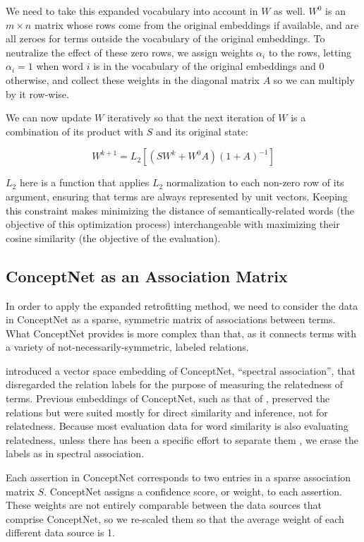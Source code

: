 \documentclass[11pt,letterpaper]{article}
\begin{document}
We need to take this expanded vocabulary into account in $W$ as well. $W^0$ is
an $m \times n$ matrix whose rows come from the original embeddings if available,
and are all zeroes for terms outside the vocabulary of the original embeddings.
To neutralize the effect of these zero rows, we assign
weights $\alpha_i$ to the rows, letting $\alpha_i = 1$ when word $i$ is
in the vocabulary of the original embeddings and $0$ otherwise, and collect these
weights in the diagonal matrix $A$ so we can multiply by it row-wise.

We can now update $W$ iteratively so that the next iteration of $W$ is a
combination of its product with $S$ and its original state:

$$
W^{k+1} = L_2\left[ \left( S W^k + W^0 A \right)\left( 1 + A \right)^{-1} \right]
$$

$L_2$ here is a function that applies $L_2$ normalization to each non-zero row
of its argument, ensuring that terms are always represented by unit vectors.
Keeping this constraint makes minimizing the distance of semantically-related
words (the objective of this optimization process) interchangeable with
maximizing their cosine similarity (the objective of the evaluation).

\subsection{ConceptNet as an Association Matrix}


In order to apply the expanded retrofitting method, we need to consider the data in
ConceptNet as a sparse, symmetric matrix of associations between terms. What
ConceptNet provides is more complex than that, as it connects terms with a
variety of not-necessarily-symmetric, labeled relations.

 introduced a vector space embedding of ConceptNet,
``spectral association'', that disregarded the relation labels for the purpose
of measuring the relatedness of terms. Previous embeddings of ConceptNet, such
as that of , preserved the relations but were
suited mostly for direct similarity and inference, not for relatedness. Because
most evaluation data for word similarity is also evaluating relatedness, unless
there has been a specific effort to separate them \cite{agirre2009similarity},
we erase the labels as in spectral association.

Each assertion in ConceptNet corresponds to two entries in a sparse
association matrix $S$.  ConceptNet assigns a confidence score, or weight, to
each assertion.  These weights are not entirely comparable between the data
sources that comprise ConceptNet, so we re-scaled them so that the average
weight of each different data source is 1.
\end{document}
